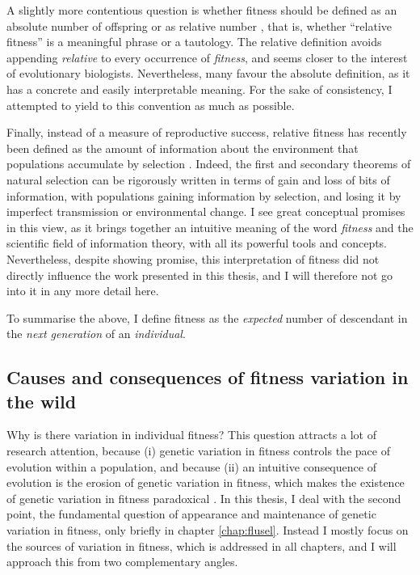 A slightly more contentious question is whether fitness should be defined as an absolute number of offspring \parencite{Wade2006} or as relative number \parencite{Rousset2004}, that is, whether ``relative fitness'' is a meaningful phrase or a tautology. The relative definition avoids appending \emph{relative} to every occurrence of \emph{fitness}, and seems closer to the interest of evolutionary biologists. Nevertheless, many favour the absolute definition, as it has a concrete and easily interpretable meaning. For the sake of consistency, I attempted to yield to this convention as much as possible. 


Finally, instead of a measure of reproductive success, relative fitness has recently been defined as the amount of information about the environment that populations accumulate by selection \parencite{Frank2012V}. Indeed, the first and secondary theorems of natural selection can be rigorously written in terms of gain and loss of bits of information, with populations gaining information by selection, and losing it by imperfect transmission or environmental change. 
I see great conceptual promises in this view, as it brings together an intuitive meaning of the word \emph{fitness} and the scientific field of information theory, with all its powerful tools and concepts. Nevertheless, despite showing promise, this interpretation of fitness did not directly influence the work presented in this thesis, and I will therefore not go into it in any more detail here. 


To summarise the above, I define fitness as the \emph{expected} number of descendant in the \emph{next generation} of an \emph{individual}.





\subsection{Causes and consequences of fitness variation in the wild}
Why is there variation in individual fitness? This question attracts a lot of research attention, because (i) genetic variation in fitness controls the pace of evolution within a population, and because (ii) an intuitive consequence of evolution is the erosion of genetic variation in fitness, which makes the existence of genetic variation in fitness paradoxical \parencite{Jones1987}. 
In this thesis, I deal with the second point, the fundamental question of appearance and maintenance of genetic variation in fitness, only briefly in chapter \ref{chap:flusel}. Instead I mostly focus on the sources of variation in fitness, which is addressed in all chapters, and I will approach this from two complementary angles. 



